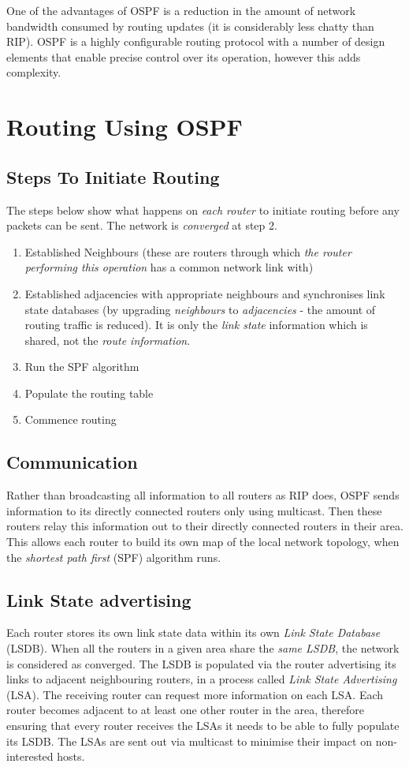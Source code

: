 One of the advantages of OSPF is a reduction in the amount of network bandwidth consumed by routing updates (it is considerably less chatty than RIP). OSPF is a highly configurable routing protocol with a number of design elements that enable precise control over its operation, however this adds complexity. 

\section{Routing Using OSPF}
\subsection{Steps To Initiate Routing}
The steps below show what happens on \textit{each router} to initiate routing before any packets can be sent. The network is \textit{converged} at step 2. 
\begin{enumerate}
    \item Established Neighbours (these are routers through which \textit{the router performing this operation} has a common network link with)
    \item Established adjacencies with appropriate neighbours and synchronises link state databases (by upgrading \textit{neighbours} to \textit{adjacencies} - the amount of routing traffic is reduced). It is only the \textit{link state} information which is shared, not the \textit{route information}. 
    \item Run the SPF algorithm
    \item Populate the routing table
    \item Commence routing
\end{enumerate}

\subsection{Communication}
Rather than broadcasting all information to all routers as RIP does, OSPF sends information to its directly connected routers only using multicast. Then these routers relay this information out to their directly connected routers in their area. This allows each router to build its own map of the local network topology, when the \textit{shortest path first} (SPF) algorithm runs. 

\subsection{Link State advertising}
Each router stores its own link state data within its own \textit{Link State Database} (LSDB). When all the routers in a given area share the \textit{same LSDB}, the network is considered as converged. The LSDB is populated via the router advertising its links to adjacent neighbouring routers, in a process called \textit{Link State Advertising} (LSA). The receiving router can request more information on each LSA. Each router becomes adjacent to at least one other router in the area, therefore ensuring that every router receives the LSAs it needs to be able to fully populate its LSDB. The LSAs are sent out via multicast to minimise their impact on non-interested hosts.\\

